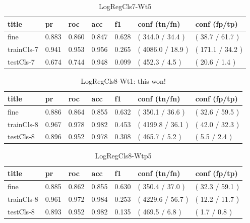 \documentclass[ms]{nuthesis}
\begin{document}
\FloatBarrier
\begin{table}[H]
\centering
\begin{tabular}{|l||l||l||l||l||l||l|}\toprule
title & pr & roc & acc & f1 & conf (tn/fn) & conf (fp/tp) \\ \midrule
fine & 0.883 & 0.860 & 0.847 & 0.628 & ( 344.0 / 34.4 ) & ( 38.7 / 61.7 ) \\
trainCls-7 & 0.941 & 0.953 & 0.956 & 0.265 & ( 4086.0 / 18.9 ) & ( 171.1 / 34.2 ) \\
testCls-7 & 0.674 & 0.744 & 0.948 & 0.099 & ( 452.3 / 4.5 ) & ( 20.6 / 1.4 ) \\ \bottomrule
\end{tabular}
\caption{LogRegCls7-Wt5}
\label{tab:LogRegCls7-Wt5}
\end{table}
\FloatBarrier


\FloatBarrier
\begin{table}[H]
\centering
\begin{tabular}{|l||l||l||l||l||l||l|}\toprule
title & pr & roc & acc & f1 & conf (tn/fn) & conf (fp/tp) \\ \midrule
fine & 0.886 & 0.864 & 0.855 & 0.632 & ( 350.1 / 36.6 ) & ( 32.6 / 59.5 ) \\
trainCls-8 & 0.967 & 0.978 & 0.982 & 0.453 & ( 4199.8 / 36.1 ) & ( 42.0 / 32.3 ) \\
testCls-8 & 0.896 & 0.952 & 0.978 & 0.308 & ( 465.7 / 5.2 ) & ( 5.5 / 2.4 ) \\ \bottomrule
\end{tabular}
\caption{LogRegCls8-Wt1: this won!}
\label{tab:LogRegCls8-Wt1}
\end{table}
\FloatBarrier


\FloatBarrier
\begin{table}[H]
\centering
\begin{tabular}{|l||l||l||l||l||l||l|}\toprule
title & pr & roc & acc & f1 & conf (tn/fn) & conf (fp/tp) \\ \midrule
fine & 0.885 & 0.862 & 0.855 & 0.630 & ( 350.4 / 37.0 ) & ( 32.3 / 59.1 ) \\
trainCls-8 & 0.961 & 0.972 & 0.984 & 0.253 & ( 4229.6 / 56.7 ) & ( 12.2 / 11.7 ) \\
testCls-8 & 0.893 & 0.952 & 0.982 & 0.135 & ( 469.5 / 6.8 ) & ( 1.7 / 0.8 ) \\ \bottomrule
\end{tabular}
\caption{LogRegCls8-Wtp5}
\label{tab:LogRegCls8-Wtp5}
\end{table}
\FloatBarrier
\end{document}
